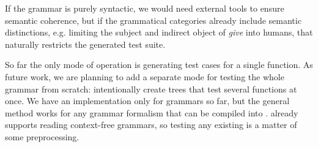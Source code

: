  If the grammar is purely
syntactic, we would need external tools to ensure semantic coherence,
but if the grammatical categories already include semantic
distinctions, e.g. limiting the subject and indirect object of
\emph{give} into humans, that naturally restricts the generated test
suite.


So far the only mode of operation is generating test cases for a
single function. 
As future work, we are planning to add a separate
mode for testing the whole grammar from scratch: intentionally create
trees that test several functions at once.
We have an implementation only for \gf{} grammars so far, but the
general method works for any grammar formalism that can be compiled
into \pmcfg{}. \gf{} already supports reading context-free grammars,
so testing any existing \cfg{} is a matter of some preprocessing. 

